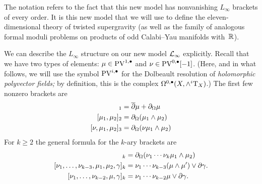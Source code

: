The notation refers to the fact that this new model has nonvanishing $L_\infty$ brackets of every order. 
It is this new model that we will use to define the eleven-dimensional theory of twisted supergravity (as well as the family of analogous formal moduli problems on products of odd Calabi--Yau manifolds with~$\mathbb{R}$). 



We can describe the $L_\infty$ structure on our new model $\mathcal L_\infty$ explicitly.
Recall that we have two types of elements: $\mu \in {\rm PV}^{1,\bullet}$ and $\nu \in {\rm PV}^{0,\bullet}[-1]$. (Here, and in what follows, we will use the symbol ${\rm PV}^{i,\bullet}$ for the Dolbeault resolution of \emph{holomorphic polyvector fields;} by definition, this is the complex $\Omega^{0,\bullet}(X,\wedge^i {\rm T}_X)$.)
The first few nonzero brackets are
\begin{align*}
[\mu]_1 & = \dbar \mu + \div \mu \\
[\mu_1,\mu_2]_2 & = \div (\mu_1 \wedge \mu_2) \\
[\nu, \mu_1,\mu_2]_3 & = \div(\nu \mu_1 \wedge \mu_2) 
\end{align*}
For $k \geq 2$ the general formula for the $k$-ary brackets are 
\begin{align*}
[\nu_1, \ldots, \nu_{k-2}, \mu_1,\mu_2]_{k} & = \div(\nu_1 \cdots \nu_k \mu_1 \wedge \mu_2) \\
[\nu_1,\ldots, \nu_{k-3}, \mu_1,\mu_2,\gamma]_k & = \nu_1 \cdots \nu_{k-3} (\mu \wedge \mu') \vee \del \gamma .\\
[\nu_1,\ldots,\nu_{k-2}, \mu, \gamma]_k & = \nu_1 \cdots \nu_{k-2} \mu \vee \del \gamma .
\end{align*}



